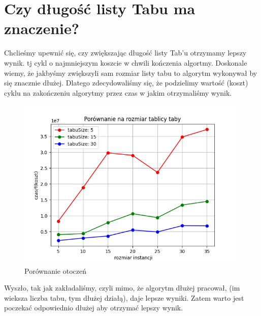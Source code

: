 \documentclass{article}
\begin{document}
    \section{Czy długość listy Tabu ma znaczenie? }

    Chclieśmy upewnić się, czy zwiększając długość listy
    Tab'u otrzymamy lepszy wynik. tj cykl o najmniejszym koszcie
    w chwili kończenia algortmy. Doskonale wiemy, że jakbyśmy
    zwiększyli sam rozmiar listy tabu to algorytm wykonywał by
    się znacznie dłużej. Dlatego zdecydowaliśmy się, że podzielimy
    wartość (koszt) cyklu na zakończeniu algorytmy przez czas w jakim
    otrzymaliśmy wynik.

    \begin{figure}[h!]
        \centering
        \includegraphics[width=11cm]{./spr2img/Figure_4.png}
        \caption{Porównanie otoczeń}
    \end{figure}

    Wyszło, tak jak zakładaliśmy, czyli mimo, że algorytm dłużej
    pracował, (im wieksza liczba tabu, tym dłużej działą), daje lepsze
    wyniki. Zatem warto jest poczekać odpowiednio dłużej aby otrzymać
    lepszy wynik.
\end{document}
